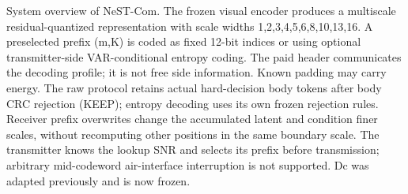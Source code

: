 System overview of NeST-Com. The frozen visual encoder produces a multiscale residual-quantized representation with scale widths 1,2,3,4,5,6,8,10,13,16. A preselected prefix (m,K) is coded as fixed 12-bit indices or using optional transmitter-side VAR-conditional entropy coding. The paid header communicates the decoding profile; it is not free side information. Known padding may carry energy. The raw protocol retains actual hard-decision body tokens after body CRC rejection (KEEP); entropy decoding uses its own frozen rejection rules. Receiver prefix overwrites change the accumulated latent and condition finer scales, without recomputing other positions in the same boundary scale. The transmitter knows the lookup SNR and selects its prefix before transmission; arbitrary mid-codeword air-interface interruption is not supported. Dc was adapted previously and is now frozen.
